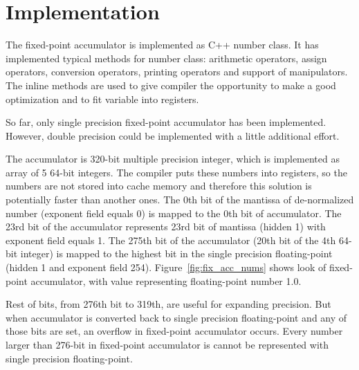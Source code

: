 \documentclass[conference]{IEEEtran}
\begin{document}
\section{Implementation}
The fixed-point accumulator is implemented as C++ number class.
It has implemented typical methods for number class: 
arithmetic operators, assign operators, conversion operators, printing operators and support of manipulators.
The inline methods are used to give compiler the opportunity to make a good optimization and to fit variable into registers.
\par
So far, only single precision fixed-point accumulator has been implemented. 
However, double precision could be implemented with a little additional effort.
\par
The accumulator is 320-bit multiple precision integer, which is implemented as array of 5 64-bit integers.
The compiler puts these numbers into registers, 
so the numbers are not stored into cache memory 
and therefore this solution is potentially faster than another ones.
The 0th bit of the mantissa of de-normalized number (exponent field equals 0) is mapped to the 0th bit of accumulator.
The 23rd bit of the accumulator represents 23rd bit of mantissa (hidden 1) with exponent field equals 1.
The 275th bit of the accumulator (20th bit of the 4th 64-bit integer) 
is mapped to the highest bit in the single precision floating-point (hidden 1 and exponent field 254).
Figure~\ref{fig:fix_acc_nums} shows look of fixed-point accumulator, with value representing floating-point number 1.0.
\par
Rest of bits, from 276th bit to 319th, are useful for expanding precision.
But when accumulator is converted back to single precision floating-point and any of those bits are set,
an overflow in fixed-point accumulator occurs.
Every number larger than 276-bit in fixed-point accumulator is cannot be represented with single precision floating-point.
\end{document}
